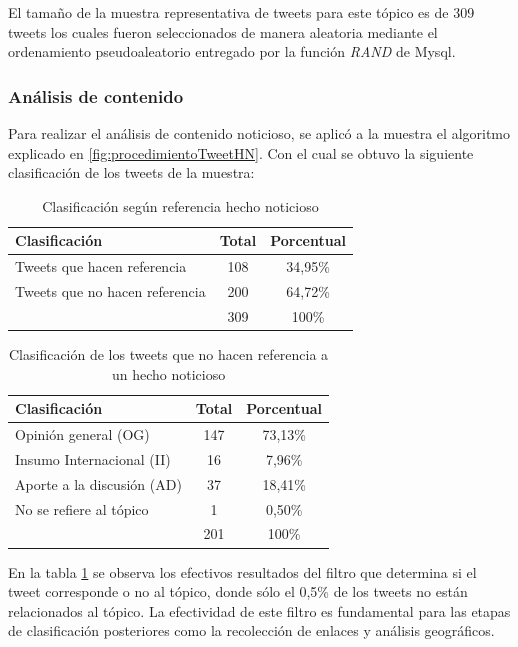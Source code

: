 El tamaño de la muestra representativa de tweets para este tópico es de 309 tweets los cuales fueron seleccionados de manera aleatoria mediante el ordenamiento pseudoaleatorio entregado por la función \emph{RAND} de Mysql. \\

\subsubsection{Análisis de contenido}

Para realizar el análisis de contenido noticioso, se aplicó a la muestra el algoritmo explicado en \ref{fig:procedimientoTweetHN}. Con el cual se obtuvo la siguiente clasificación de los tweets de la muestra:

\begin{table}[h]
	\centering
	\begin{tabular}{| l | c | c |}
		\hline
		Clasificación    & Total & Porcentual\\ \hline
		Tweets que hacen referencia    & 108 & 34,95\%\\ \hline
		Tweets que no hacen referencia & 200 & 64,72\%\\ \hline
		    & 309 & 100\% \\
		\hline
	\end{tabular}
	\caption {Clasificación según referencia hecho noticioso}
\end{table}

\begin{table}[h]
	\centering
	\begin{tabular}{| l | c | c |}
		\hline
		Clasificación    & Total & Porcentual\\ \hline
		Opinión general (OG)  & 147 & 73,13\% \\ \hline
		Insumo Internacional (II) & 16 & 7,96\% \\ \hline
		Aporte a la discusión (AD) & 37 & 18,41\%\\ \hline
		No se refiere al tópico & 1 & 0,50\% \\ \hline
		& 201 & 100\% \\
		\hline
	\end{tabular}
	\caption {Clasificación de los tweets que no hacen referencia a un hecho noticioso}
	\label{clasifTweetsNoHechoNoticioso}
\end{table}

En la tabla \ref{clasifTweetsNoHechoNoticioso} se observa los efectivos resultados del filtro que determina si el tweet corresponde o no al tópico, donde sólo el 0,5\% de los tweets no están relacionados al tópico. La efectividad de este filtro  es fundamental para las etapas de clasificación
posteriores como la recolección de enlaces y análisis geográficos. 

